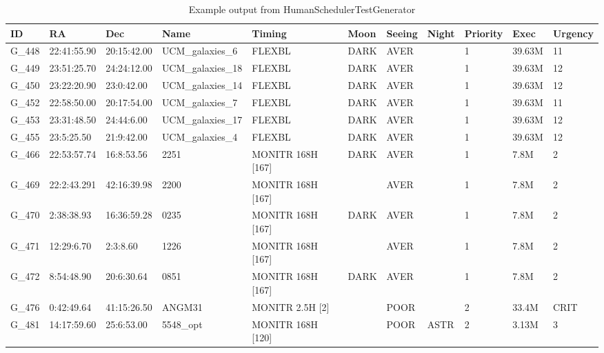 
\begin{landscape}

\begin{table}
\begin{center}
\caption{Example output from HumanSchedulerTestGenerator}
\begin{tabular}{|l|l|l|l|l|l|l|l|l|l|l|}
\hline
{\bf ID} & {\bf RA}    & {\bf Dec} & {\bf Name} & {\bf Timing} & {\bf Moon}  & {\bf Seeing} & {\bf Night}   & {\bf Priority}    & {\bf Exec}   & {\bf Urgency} \\
\hline
G\_448  &22:41:55.90  &20:15:42.00  &UCM\_galaxies\_6&FLEXBL  &DARK &AVER  &       &1 &39.63M  &11 \\
\hline
G\_449  &23:51:25.70  &24:24:12.00  &UCM\_galaxies\_18&FLEXBL &DARK &AVER  &       &1 &39.63M  &12 \\
\hline
G\_450  &23:22:20.90  &23:0:42.00&UCM\_galaxies\_14  &FLEXBL  &DARK &AVER  &       &1 &39.63M  &12 \\
\hline
G\_452  &22:58:50.00  &20:17:54.00  &UCM\_galaxies\_7&FLEXBL  &DARK &AVER  &       &1 &39.63M  &11 \\
\hline
G\_453  &23:31:48.50  &24:44:6.00&UCM\_galaxies\_17  &FLEXBL  &DARK &AVER  &       &1 &39.63M  &12 \\
\hline
G\_455  &23:5:25.50&21:9:42.00&UCM\_galaxies\_4&FLEXBL        &DARK &AVER  &       &1 &39.63M  &12  \\
\hline
G\_466  &22:53:57.74  &16:8:53.56&2251  &MONITR 168H [167]    &DARK &AVER  &       &1 &7.8M   &2  \\
\hline
G\_469  &22:2:43.291  &42:16:39.98  &2200 &MONITR 168H [167]  &     &AVER  &       &1 &7.8M   &2 \\ 
\hline
G\_470  &2:38:38.93&16:36:59.28  &0235 &MONITR 168H [167]     &DARK &AVER  &       &1 &7.8M   &2  \\
\hline
G\_471  &12:29:6.70&2:3:8.60  &1226 &MONITR 168H [167]        &     &AVER  &       &1 &7.8M   &2  \\
\hline
G\_472  &8:54:48.90&20:6:30.64&0851 &MONITR 168H [167]        &DARK &AVER  &       &1 &7.8M   &2  \\
\hline
G\_476  &0:42:49.64&41:15:26.50  &ANGM31  &MONITR 2.5H [2]    &     &POOR  &       &2 &33.4M   &CRIT  \\
\hline
G\_481  &14:17:59.60  &25:6:53.00&5548\_opt&MONITR 168H [120] &     &POOR  &ASTR   &2 &3.13M  &3  \\
\hline
\end{tabular}
\end{center}
\end{table}

\end{landscape}

